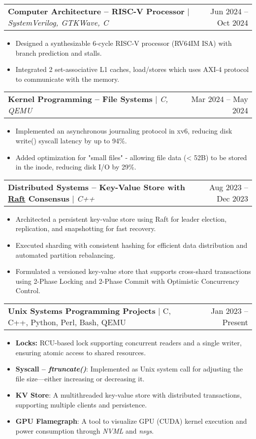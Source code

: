 \documentclass[letterpaper,11pt]{article}
\makeatletter
\newcommand{\resumeItem}[1]{
  \item\small{
    {#1 \vspace{-2pt}}
  }
}
\newcommand{\resumeProjectHeading}[2]{
    \item
    \begin{tabular*}{1.001\textwidth}{l@{\extracolsep{\fill}}r}
      \small#1 & \small #2\\
    \end{tabular*}\vspace{-7pt}
}
\newcommand{\resumeItemListStart}{\begin{itemize}}
\newcommand{\resumeItemListEnd}{\end{itemize}\vspace{-5pt}}
\makeatother
\begin{document}
\resumeProjectHeading
{\textbf{\normalsize{Computer Architecture -- RISC-V Processor}} $|$ \emph{SystemVerilog, GTKWave, C}}{Jun 2024 -- Oct 2024}
\resumeItemListStart
\resumeItem{Designed a synthesizable 6-cycle RISC-V processor (RV64IM ISA) with branch prediction and stalls.}
\resumeItem{Integrated 2 set-associative L1 caches, load/stores which uses AXI-4 protocol to communicate with the memory.}
\resumeItemListEnd
\vspace{-17pt}

\resumeProjectHeading
{\textbf{\normalsize{Kernel Programming -- File Systems}} $|$ \emph{C, QEMU}}{Mar 2024 -- May 2024}
\resumeItemListStart
\resumeItem{
  Implemented an asynchronous journaling protocol in xv6, reducing disk write() syscall latency by up to 94\%.
}
\resumeItem{
  Added optimization for "small files" - allowing file data (\textless{} 52B) to be stored in the inode, reducing disk I/O by 29\%.
}

\resumeItemListEnd
\vspace{-17pt}

\resumeProjectHeading
{\textbf{\normalsize{Distributed Systems -- Key-Value Store with \href{https://raft.github.io/raft.pdf}{Raft} Consensus}} $|$ \emph{C++}}{Aug 2023 -- Dec 2023}
\resumeItemListStart
\resumeItem{Architected a persistent key-value store using Raft for leader election, replication, and snapshotting for fast recovery.}
\resumeItem{Executed sharding with consistent hashing for efficient data distribution and automated partition rebalancing.}
\resumeItem{Formulated a versioned key-value store that supports cross-shard transactions using 2-Phase Locking and 2-Phase Commit
  with Optimistic Concurrency Control.}
\resumeItemListEnd
\vspace{-17pt}

\resumeProjectHeading
{\textbf{\normalsize{Unix Systems Programming Projects}} $|$ C, C++, Python, Perl, Bash, QEMU}{Jan 2023 -- Present}
\resumeItemListStart
\resumeItem{\textbf{Locks:} RCU-based lock supporting concurrent readers and a single writer, ensuring atomic access to shared resources.}
\resumeItem{
  \textbf{Syscall -- \textit{ftruncate()}}: Implemented as Unix system call for adjusting the file size—either increasing or decreasing it.
}
\resumeItem{\textbf{KV Store}: A multithreaded key-value store with distributed transactions, supporting multiple clients and persistence.}
\resumeItem{\textbf{GPU Flamegraph}: A tool to visualize GPU (CUDA) kernel execution and power consumption through \textit{NVML} and \textit{nsys}.}
\resumeItemListEnd
\vspace{-17pt}
\end{document}
